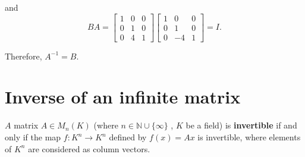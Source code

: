 and
\[ 
    BA = 
    \begin{bmatrix}
    1 & 0 & 0\\
    0 & 1 & 0\\
    0 & 4 & 1
\end{bmatrix}
\begin{bmatrix}
    1 & 0 & 0\\
    0 & 1 & 0\\
    0 &-4 & 1
\end{bmatrix}
= I.
\]

Therefore, $A^{-1} = B$.   


\vspace{30pt}
\section{Inverse of an infinite matrix}

\begin{definition}
$A$ matrix $A \in M_{n}(K) $ (where $n \in \mathbb{N} \cup \{\infty\}$ , $K$ be a field) is \textbf{invertible} if and only if the map $f : K^{n} \to K^{n}$ defined by $f(x) = Ax$ is invertible, where elements of $K^{n}$ are considered as column vectors. 
\end{definition}


